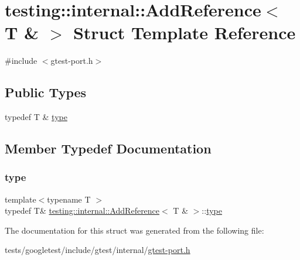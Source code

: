 \hypertarget{structtesting_1_1internal_1_1AddReference_3_01T_01_6_01_4}{}\section{testing\+:\+:internal\+:\+:Add\+Reference$<$ T \& $>$ Struct Template Reference}
\label{structtesting_1_1internal_1_1AddReference_3_01T_01_6_01_4}


{\ttfamily \#include $<$gtest-\/port.\+h$>$}

\subsection*{Public Types}
\begin{DoxyCompactItemize}
\item 
typedef T \& \hyperlink{structtesting_1_1internal_1_1AddReference_3_01T_01_6_01_4_a93c064cdcdaced0abd167258425e57af}{type}
\end{DoxyCompactItemize}


\subsection{Member Typedef Documentation}
\mbox{\label{structtesting_1_1internal_1_1AddReference_3_01T_01_6_01_4_a93c064cdcdaced0abd167258425e57af}} 
\subsubsection{\texorpdfstring{type}{type}}
{\footnotesize\ttfamily template$<$typename T $>$ \\
typedef T\& \hyperlink{structtesting_1_1internal_1_1AddReference}{testing\+::internal\+::\+Add\+Reference}$<$ T \& $>$\+::\hyperlink{structtesting_1_1internal_1_1AddReference_3_01T_01_6_01_4_a93c064cdcdaced0abd167258425e57af}{type}}



The documentation for this struct was generated from the following file\+:\begin{DoxyCompactItemize}
\item 
tests/googletest/include/gtest/internal/\hyperlink{gtest-port_8h}{gtest-\/port.\+h}\end{DoxyCompactItemize}

